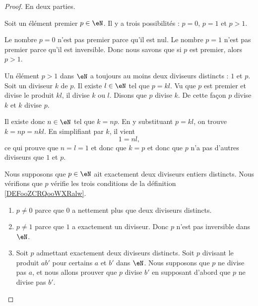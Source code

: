 \begin{proof}
	En deux parties.
	\begin{subproof}
		\spitem[\( \Rightarrow\)]
		Soit un élément premier \( p\in \eN\). Il y a trois possibilités : \( p=0\), \( p=1\) et \( p>1\).

		Le nombre \( p=0\) n'est pas premier parce qu'il est nul. Le nombre \( p=1\) n'est pas premier parce qu'il est inversible. Donc nous savons que si \( p\) est premier, alors \( p>1\).

		Un élément \( p>1\) dans \( \eN\) a toujours au moins deux diviseurs distincts : \( 1\) et \( p\). Soit un diviseur \( k\) de \( p\). Il existe \( l\in \eN\) tel que \( p=kl\). Vu que \( p\) est premier et divise le produit \( kl\), il divise \( k\) ou \( l\). Disons que \( p\) divise \( k\). De cette façon \( p\) divise \( k\) et \( k\) divise \( p\).

		Il existe donc \( n\in \eN\) tel que \( k=np\). En y substituant \( p=kl\), on trouve \( k=np=nkl\). En simplifiant par \( k\), il vient
		\begin{equation}
			1=nl,
		\end{equation}
		ce qui prouve que \( n=l=1\) et donc que \( k=p\) et donc que \( p\) n'a pas d'autres diviseurs que \( 1\) et \( p\).

		\spitem[\( \Leftarrow\)]
		Nous supposons que \( p\in \eN\) ait exactement deux diviseurs entiers distincts. Nous vérifions que \( p\) vérifie les trois conditions de la définition \ref{DEFooZCRQooWXRalw}.

		\begin{enumerate}
			\item
			      \( p\neq 0\) parce que \( 0\) a nettement plus que deux diviseurs distincts.
			\item
			      \( p\neq 1\) parce que \( 1\) a exactement un diviseur. Donc \( p\) n'est pas inversible dans \( \eN\).
			\item
			      Soit \( p\) admettant exactement deux diviseurs distincts. Soit \( p\) divisant le produit \( ab'\) pour certains \( a\) et \( b'\) dans \( \eN\). Nous supposons que \( p\) ne divise pas \( a\), et nous allons prouver que \( p\) divise \( b'\) en supposant d'abord que \( p\) ne divise pas \( b'\).


\end{enumerate}
\end{subproof}
\end{proof}
